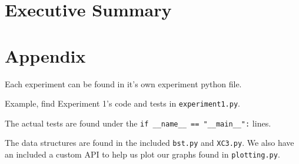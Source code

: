 \documentclass{article}
\begin{document}

\section{Executive Summary}


\section{Appendix}

Each experiment can be found in it's own experiment python file. 

Example, find Experiment 1's code and tests in \verb|experiment1.py|.

The actual tests are found under the \verb|if __name__ == "__main__":| lines.

The data structures are found in the included \verb|bst.py| and \verb|XC3.py|. We also have an included a custom API to help us plot our graphs found in \verb|plotting.py|.
\end{document}

